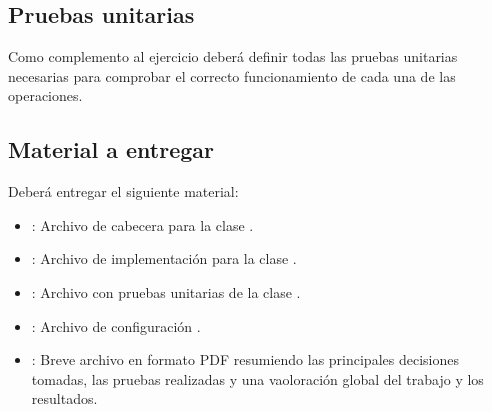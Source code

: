 \subsection{Pruebas unitarias}

Como complemento al ejercicio deberá definir todas las pruebas unitarias
necesarias para comprobar el correcto funcionamiento de cada una de las
operaciones.

\subsection{Material a entregar}

Deberá entregar el siguiente material:

\begin{itemize}
  \item {}: Archivo de cabecera para la clase .
  \item {}: Archivo de implementación para la clase
.
  \item {}: Archivo con pruebas unitarias de la clase
.
  \item {}: Archivo de configuración .
  \item {}: Breve archivo en formato PDF resumiendo las
principales decisiones tomadas, las pruebas realizadas y una vaoloración global
del trabajo y los resultados.
\end{itemize}
